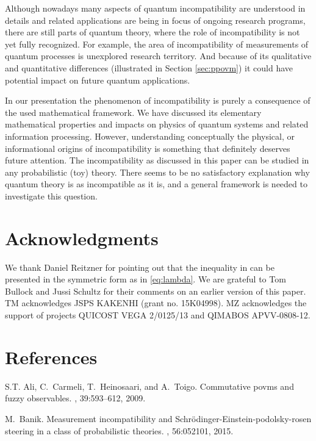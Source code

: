 \documentclass[12pt]{iopart}
\theoremstyle{definition}
\begin{document}
{Although nowadays many aspects of quantum incompatibility are 
understood in details and related applications are being in focus of 
ongoing research programs, there are still parts of quantum theory, where the role of incompatibility is not yet fully recognized. For example, the area 
of incompatibility of measurements of quantum processes is unexplored research territory. 
And because of its qualitative and quantitative 
differences (illustrated in Section \ref{sec:ppovm}) it could have potential 
impact on future quantum applications.
  
In our presentation the phenomenon of incompatibility 
is purely a consequence of the used mathematical framework. We have 
discussed its elementary mathematical properties and 
impacts on physics of quantum systems and related information 
processing. However, understanding conceptually the physical, 
or informational origins of incompatibility is something that 
definitely deserves future attention. The incompatibility as discussed 
in this paper can be studied in any probabilistic 
(toy) theory. 
There seems to be no satisfactory explanation why quantum theory is as incompatible as it is, and a general framework is needed to investigate this question.


\section*{Acknowledgments}

We thank Daniel Reitzner for pointing out that the inequality in \cite{CaHeTo12} can be presented in the symmetric form as in \eqref{eq:lambda}. We are grateful to Tom Bullock and Jussi Schultz for their comments on an earlier version of this paper. 
TM acknowledges JSPS KAKENHI (grant no. 15K04998).
MZ acknowledges the support of projects QUICOST VEGA 2/0125/13 and QIMABOS APVV-0808-12.

\section*{References}

\begin{thebibliography}{10}

S.T. Ali, C.~Carmeli, T.~Heinosaari, and A.~Toigo.
\newblock Commutative povms and fuzzy observables.
, 39:593--612, 2009.

M.~Banik.
\newblock Measurement incompatibility and
  {S}chr\"odinger-{E}instein-podolsky-rosen steering in a class of
  probabilistic theories.
, 56:052101, 2015.


\end{thebibliography}}
\end{document}
